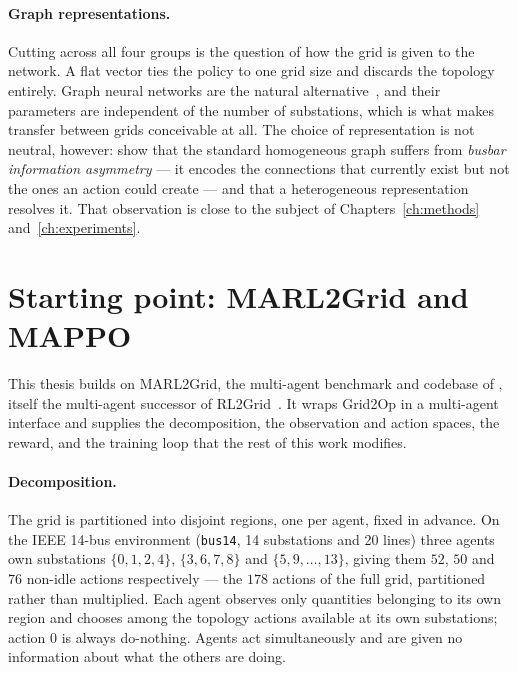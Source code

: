 \paragraph{Graph representations.}
Cutting across all four groups is the question of how the grid is given to the
network. A flat vector ties the policy to one grid size and discards the
topology entirely. Graph neural networks are the natural
alternative~\cite{kipf2017gcn,velickovic2018gat,xu2018how}, and their parameters
are independent of the number of substations, which is what makes transfer
between grids conceivable at all. The choice of representation is not neutral,
however: \textcite{dejong2025gnntopo} show that the standard homogeneous graph
suffers from \emph{busbar information asymmetry} --- it encodes the connections
that currently exist but not the ones an action could create --- and that a
heterogeneous representation resolves it. That observation is close to the
subject of Chapters~\ref{ch:methods} and~\ref{ch:experiments}.

\section{Starting point: MARL2Grid and MAPPO}
\label{sec:intro-marl2grid}

This thesis builds on MARL2Grid, the multi-agent benchmark and codebase of
\textcite{marchesini2026marl2grid}, itself the multi-agent successor of
RL2Grid~\cite{marchesini2025rl2grid}. It wraps Grid2Op in a multi-agent
interface and supplies the decomposition, the observation and action spaces, the
reward, and the training loop that the rest of this work modifies.

\paragraph{Decomposition.}
The grid is partitioned into disjoint regions, one per agent, fixed in advance.
On the IEEE 14-bus environment (\texttt{bus14}, 14 substations and 20 lines)
three agents own substations $\{0,1,2,4\}$, $\{3,6,7,8\}$ and
$\{5,9,\ldots,13\}$, giving them $52$, $50$ and $76$ non-idle actions
respectively --- the $178$ actions of the full grid, partitioned rather than
multiplied. Each agent observes only quantities belonging to its own region and
chooses among the topology actions available at its own substations; action $0$
is always do-nothing. Agents act simultaneously and are given no information
about what the others are doing.

